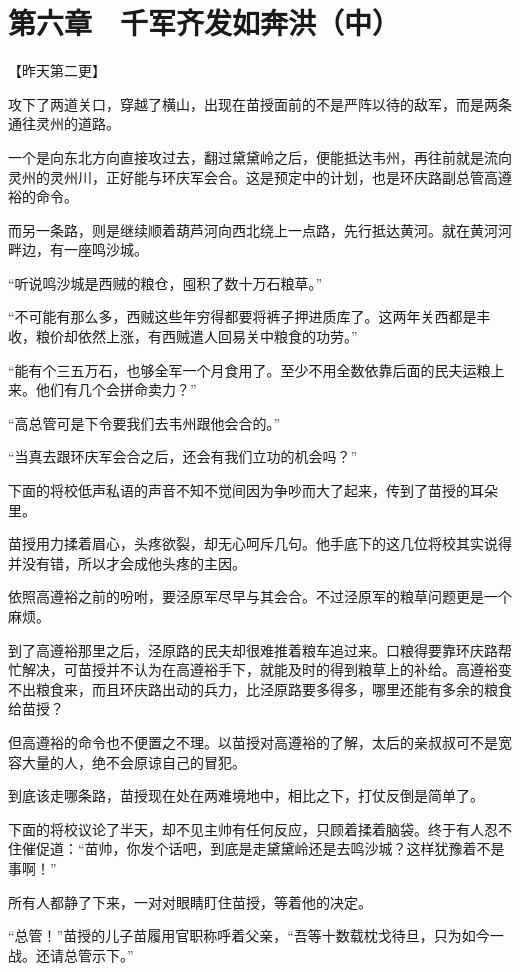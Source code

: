 \section{第六章　千军齐发如奔洪（中）}

【昨天第二更】

攻下了两道关口，穿越了横山，出现在苗授面前的不是严阵以待的敌军，而是两条通往灵州的道路。

一个是向东北方向直接攻过去，翻过黛黛岭之后，便能抵达韦州，再往前就是流向灵州的灵州川，正好能与环庆军会合。这是预定中的计划，也是环庆路副总管高遵裕的命令。

而另一条路，则是继续顺着葫芦河向西北绕上一点路，先行抵达黄河。就在黄河河畔边，有一座鸣沙城。

“听说鸣沙城是西贼的粮仓，囤积了数十万石粮草。”

“不可能有那么多，西贼这些年穷得都要将裤子押进质库了。这两年关西都是丰收，粮价却依然上涨，有西贼遣人回易关中粮食的功劳。”

“能有个三五万石，也够全军一个月食用了。至少不用全数依靠后面的民夫运粮上来。他们有几个会拼命卖力？”

“高总管可是下令要我们去韦州跟他会合的。”

“当真去跟环庆军会合之后，还会有我们立功的机会吗？”

下面的将校低声私语的声音不知不觉间因为争吵而大了起来，传到了苗授的耳朵里。

苗授用力揉着眉心，头疼欲裂，却无心呵斥几句。他手底下的这几位将校其实说得并没有错，所以才会成他头疼的主因。

依照高遵裕之前的吩咐，要泾原军尽早与其会合。不过泾原军的粮草问题更是一个麻烦。

到了高遵裕那里之后，泾原路的民夫却很难推着粮车追过来。口粮得要靠环庆路帮忙解决，可苗授并不认为在高遵裕手下，就能及时的得到粮草上的补给。高遵裕变不出粮食来，而且环庆路出动的兵力，比泾原路要多得多，哪里还能有多余的粮食给苗授？

但高遵裕的命令也不便置之不理。以苗授对高遵裕的了解，太后的亲叔叔可不是宽容大量的人，绝不会原谅自己的冒犯。

到底该走哪条路，苗授现在处在两难境地中，相比之下，打仗反倒是简单了。

下面的将校议论了半天，却不见主帅有任何反应，只顾着揉着脑袋。终于有人忍不住催促道：“苗帅，你发个话吧，到底是走黛黛岭还是去鸣沙城？这样犹豫着不是事啊！”

所有人都静了下来，一对对眼睛盯住苗授，等着他的决定。

“总管！”苗授的儿子苗履用官职称呼着父亲，“吾等十数载枕戈待旦，只为如今一战。还请总管示下。”

